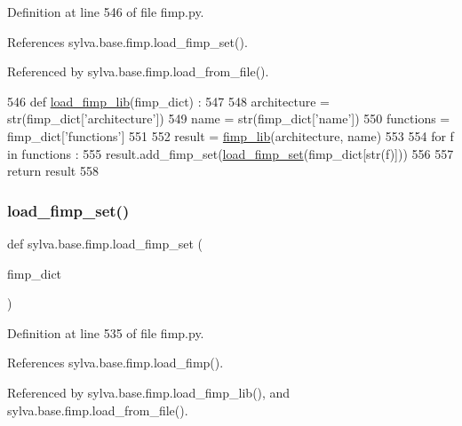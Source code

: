 Definition at line 546 of file fimp.\+py.



References sylva.\+base.\+fimp.\+load\+\_\+fimp\+\_\+set().



Referenced by sylva.\+base.\+fimp.\+load\+\_\+from\+\_\+file().


\begin{DoxyCode}
546 \textcolor{keyword}{def }\hyperlink{namespacesylva_1_1base_1_1fimp_a57a8b55e554c3c8977bdca59b12fde4f}{load\_fimp\_lib}(fimp\_dict) :
547 
548   architecture = str(fimp\_dict[\textcolor{stringliteral}{'architecture'}])
549   name = str(fimp\_dict[\textcolor{stringliteral}{'name'}])
550   functions = fimp\_dict[\textcolor{stringliteral}{'functions'}]
551 
552   result = \hyperlink{namespacesylva_1_1code__generation_1_1fimp__lib_ad858d74deddd94b1802c3fad074f1336}{fimp\_lib}(architecture, name)
553 
554   \textcolor{keywordflow}{for} f \textcolor{keywordflow}{in} functions :
555     result.add\_fimp\_set(\hyperlink{namespacesylva_1_1base_1_1fimp_ad713bc31de8ee05df0c1184daba1ffb8}{load\_fimp\_set}(fimp\_dict[str(f)]))
556 
557   \textcolor{keywordflow}{return} result
558 
\end{DoxyCode}
\mbox{\label{namespacesylva_1_1base_1_1fimp_ad713bc31de8ee05df0c1184daba1ffb8}} 
\subsubsection{\texorpdfstring{load\+\_\+fimp\+\_\+set()}{load\_fimp\_set()}}
{\footnotesize\ttfamily def sylva.\+base.\+fimp.\+load\+\_\+fimp\+\_\+set (\begin{DoxyParamCaption}\item[{}]{fimp\+\_\+dict }\end{DoxyParamCaption})}



Definition at line 535 of file fimp.\+py.



References sylva.\+base.\+fimp.\+load\+\_\+fimp().



Referenced by sylva.\+base.\+fimp.\+load\+\_\+fimp\+\_\+lib(), and sylva.\+base.\+fimp.\+load\+\_\+from\+\_\+file().


